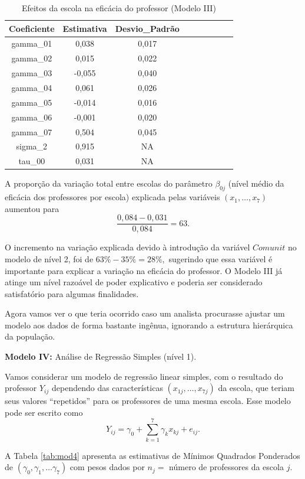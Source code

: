 \documentclass[]{book}
\theoremstyle{definition}
\theoremstyle{definition}
\theoremstyle{definition}
\theoremstyle{remark}
\begin{document}
\begin{table}

\caption{\label{tab:mod3}Efeitos da escola na eficácia do professor (Modelo III)}
\centering
\begin{tabular}[t]{ccccccccc}
\toprule
Coeficiente & Estimativa & Desvio\_Padrão\\
\midrule
gamma\_01 & 0,038 & 0,017\\
gamma\_02 & 0,015 & 0,022\\
gamma\_03 & -0,055 & 0,040\\
gamma\_04 & 0,061 & 0,026\\
gamma\_05 & -0,014 & 0,016\\
\addlinespace
gamma\_06 & -0,001 & 0,020\\
gamma\_07 & 0,504 & 0,045\\
sigma\_2 & 0,915 & NA\\
tau\_00 & 0,031 & NA\\
\bottomrule
\end{tabular}
\end{table}

A proporção da variação total entre escolas do parâmetro \(\beta _{0j}\)
(nível médio da eficácia dos professores por escola) explicada pelas
variáveis \(\left( x_{1},\ldots ,x_{7}\right)\) aumentou para \[
\frac{0,084-0,031}{0,084}=63.
\]

O incremento na variação explicada devido à introdução da variável
\(Comunit\) no modelo de nível 2, foi de \(63\%-35\%=28\%,\) sugerindo
que essa variável é importante para explicar a variação na eficácia do
professor. O Modelo III já atinge um nível razoável de poder explicativo
e poderia ser considerado satisfatório para algumas finalidades.

Agora vamos ver o que teria ocorrido caso um analista procurasse ajustar
um modelo aos dados de forma bastante ingênua, ignorando a estrutura
hierárquica da população.

\textbf{Modelo IV:} Análise de Regressão Simples (nível 1).

Vamos considerar um modelo de regressão linear simples, com o resultado
do professor \(Y_{ij}\) dependendo das características
\(\left(x_{1j},\ldots ,x_{7j}\right)\) da escola, que teriam seus
valores ``repetidos'' para os professores de uma mesma escola. Esse
modelo pode ser escrito como \[
Y_{ij}=\gamma _{0}+\sum\limits_{k=1}^{7}\gamma _{k}x_{kj}+e_{ij}.
\]

A Tabela \ref{tab:mod4} apresenta as estimativas de Mínimos Quadrados
Ponderados de
\(\left(\gamma _{0},\gamma _{1},\ldots \gamma _{7}\right)\) com pesos
dados por \(n_{j}=\) número de professores da escola \(j\).
\end{document}
